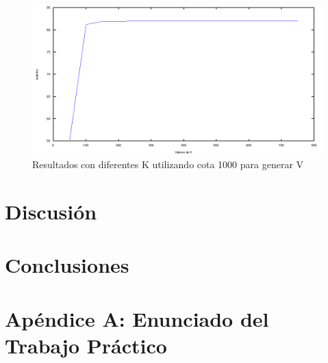 \documentclass[a4paper,10pt,twoside]{article}
\begin{document}
\begin{figure}[H]
  \centering
  \includegraphics[width=15cm]{aciertosVsK.png}
  \caption{Resultados con diferentes K utilizando cota 1000 para generar V}
\end{figure}



\section{Discusión}




\section{Conclusiones}




\newpage

\section{Apéndice A: Enunciado del Trabajo Práctico}


\end{document}

